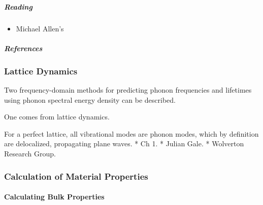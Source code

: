 \documentclass[letterpaper,10pt,english]{sphinxmanual}
\begin{document}
\subparagraph{Reading}
\label{\detokenize{md/index:reading}}\begin{itemize}
\item {} 
\label{\detokenize{md/index:id1}}{\hyperref[\detokenize{md/index:allen2004-intro-md}]{\sphinxcrossref{{[}A+04{]}}}} Michael Allen’s 

\end{itemize}


\subparagraph{References}
\label{\detokenize{md/index:references}}



\subsubsection{Lattice Dynamics}
\label{\detokenize{ld/index:lattice-dynamics}}\label{\detokenize{ld/index:ld}}\label{\detokenize{ld/index::doc}}
Two frequency-domain methods for predicting phonon frequencies and lifetimes using phonon spectral energy density can be described.

One comes from lattice dynamics.

For a perfect lattice, all vibrational modes are phonon modes, which by definition are delocalized, propagating plane waves.
* Ch 1. 
* Julian Gale. 
* Wolverton Research Group. 


\subsubsection{Calculation of Material Properties}
\label{\detokenize{calc_material_properties/index:calculation-of-material-properties}}\label{\detokenize{calc_material_properties/index:calc-material-properties}}\label{\detokenize{calc_material_properties/index::doc}}

\paragraph{Calculating Bulk Properties}
\label{\detokenize{calc_material_properties/calc_bulk_properties:calculating-bulk-properties}}\label{\detokenize{calc_material_properties/calc_bulk_properties::doc}}
\end{document}
